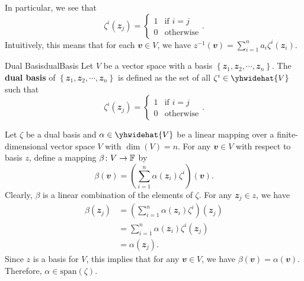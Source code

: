 \documentclass[math, code]{amznotes}
\theoremstyle{remark}
\begin{document}
In particular, we see that
\begin{equation*}
    \zeta^i(\mathbfit{z}_j) = \begin{cases}
        1 & \textrm{if } i = j \\
        0 & \textrm{otherwise}
    \end{cases}.
\end{equation*}
Intuitively, this means that for each $\mathbfit{v} \in V$, we have $z^{-1}(\mathbfit{v}) = \sum_{i = 1}^{n}a_i\zeta^i(\mathbfit{z}_i)$.
\begin{dfnbox}{Dual Basis}{dualBasis}
    Let $V$ be a vector space with a basis $\left\{\mathbfit{z}_1, \mathbfit{z}_2, \cdots, \mathbfit{z}_n\right\}$. The {\color{red} \textbf{dual basis}} of $\left\{\mathbfit{z}_1, \mathbfit{z}_2, \cdots, \mathbfit{z}_n\right\}$ is defined as the set of all $\zeta^i \in \yhwidehat{V}$ such that 
    \begin{equation*}
        \zeta^i(\mathbfit{z}_j) = \begin{cases}
            1 & \textrm{if } i = j \\
            0 & \textrm{otherwise}
        \end{cases}.
    \end{equation*}
\end{dfnbox}
Let $\zeta$ be a dual basis and $\alpha \in \yhwidehat{V}$ be a linear mapping over a finite-dimensional vector space $V$ with $\dim(V) = n$. For any $\mathbfit{v} \in V$ with respect to basis $z$, define a mapping $\beta \colon V \to \mathbb{F}$ by 
\begin{equation*}
    \beta(\mathbfit{v}) = \left(\sum_{i = 1}^{n}\alpha(\mathbfit{z}_i)\zeta^i\right)(\mathbfit{v}).
\end{equation*}
Clearly, $\beta$ is a linear combination of the elements of $\zeta$. For any $\mathbfit{z}_j \in z$, we have
\begin{align*}
    \beta(\mathbfit{z}_j) & = \left(\sum_{i = 1}^{n}\alpha(\mathbfit{z}_i)\zeta^i\right)(\mathbfit{z}_j) \\
    & = \sum_{i = 1}^{n}\alpha(\mathbfit{z}_i)\zeta^i(\mathbfit{z}_j) \\
    & = \alpha(\mathbfit{z}_j).
\end{align*}
Since $z$ is a basis for $V$, this implies that for any $\mathbfit{v} \in V$, we have $\beta(\mathbfit{v}) = \alpha(\mathbfit{v})$. Therefore, $\alpha \in \mathrm{span}(\zeta)$. 
\end{document}
